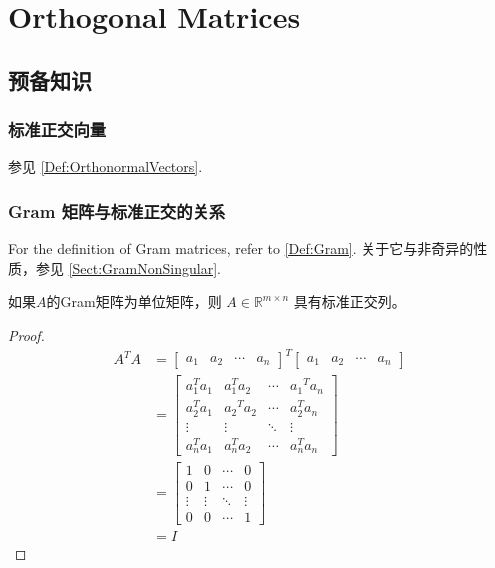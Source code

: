 \chapter{Orthogonal Matrices}

\section{预备知识}

\subsection{标准正交向量}

参见 \ref{Def:OrthonormalVectors}.

\subsection{Gram 矩阵与标准正交的关系}

For the definition of Gram matrices, refer to \ref{Def:Gram}. 关于它与非奇异的性质，参见 \ref{Sect:GramNonSingular}.

\begin{theorem}
    如果$A$的Gram矩阵为单位矩阵，则 $ A \in \mathbb{R}^{m \times n} $ 具有标准正交列。
\end{theorem}

\begin{proof}
    $$ \begin{aligned} A^{T} A&=\left[\begin{array}{llll}a_{1} & a_{2} & \cdots & a_{n}\end{array}\right]^{T}\left[\begin{array}{llll}a_{1} & a_{2} & \cdots & a_{n}\end{array}\right] 
    \\ &=\left[\begin{array}{cccc}a_{1}^{T} a_{1} & a_{1}^{T} a_{2} & \cdots & a_{1}{ }^{T} a_{n} \\ a_{2}^{T} a_{1} & a_{2}{ }^{T} a_{2} & \cdots & a_{2}^{T} a_{n} \\ \vdots & \vdots & \ddots & \vdots \\ a_{n}^{T} a_{1} & a_{n}^{T} a_{2} & \cdots & a_{n}^{T} a_{n}\end{array}\right] 
    \\  &=\left[\begin{array}{cccc}1 & 0 & \cdots & 0 \\ 0 & 1 & \cdots & 0 \\ \vdots & \vdots & \ddots & \vdots \\ 0 & 0 & \cdots & 1\end{array}\right] 
    \\ & =I  \end{aligned} $$
\end{proof}

